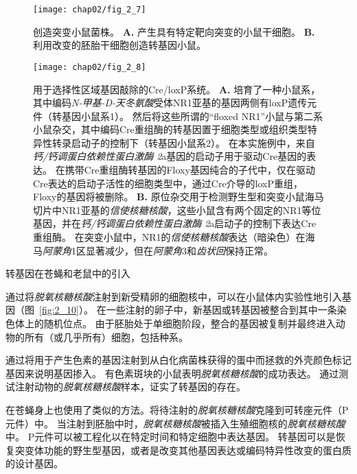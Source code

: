 \begin{figure}[htbp]
	\centering
	\texttt{[image: chap02/fig\_2\_7]}
	\caption{创造突变小鼠菌株\cite{alberts2017molecular}。
		\textbf{A.} 产生具有特定靶向突变的小鼠干细胞。
		\textbf{B.} 利用改变的胚胎干细胞创造转基因小鼠。}
	\label{fig:2_7}
\end{figure}


\begin{figure}[htbp]
	\centering
	\texttt{[image: chap02/fig\_2\_8]}
	\caption{用于选择性区域基因敲除的Cre/loxP系统。
		\textbf{A.} 培育了一种小鼠系，其中编码\textit{N-甲基-D-天冬氨酸}受体NR1亚基的基因两侧有loxP遗传元件（转基因小鼠系1）。
		然后将这些所谓的“floxed NR1”小鼠与第二系小鼠杂交，其中编码Cre重组酶的转基因置于细胞类型或组织类型特异性转录启动子的控制下（转基因小鼠系2）。
		在本实施例中，来自\textit{钙/钙调蛋白依赖性蛋白激酶 2}a基因的启动子用于驱动Cre基因的表达。
		在携带Cre重组酶转基因的Floxy基因纯合的子代中，仅在驱动Cre表达的启动子活性的细胞类型中，通过Cre介导的loxP重组，Floxy的基因将被删除。
		\textbf{B.} 原位杂交用于检测野生型和突变小鼠海马切片中NR1亚基的\textit{信使核糖核酸}，这些小鼠含有两个固定的NR1等位基因，并在\textit{钙/钙调蛋白依赖性蛋白激酶 2}a启动子的控制下表达Cre重组酶。
		在突变小鼠中，NR1的\textit{信使核糖核酸}表达（暗染色）在海马\textit{阿蒙角}1区显著减少，但在\textit{阿蒙角}3和\textit{齿状回}保持正常\cite{tsien1996essential}。}
	\label{fig:2_8}
\end{figure}



\begin{proposition}[神经解剖学导航术语] \label{box:2_3}
	
	\quad \quad 转基因在苍蝇和老鼠中的引入
	
	\quad \quad 通过将\textit{脱氧核糖核酸}注射到新受精卵的细胞核中，可以在小鼠体内实验性地引入基因（图~\ref{fig:2_10}）。
	在一些注射的卵子中，新基因或转基因被整合到其中一条染色体上的随机位点。
	由于胚胎处于单细胞阶段，整合的基因被复制并最终进入动物的所有（或几乎所有）细胞，包括种系。
	
	\quad \quad 通过将用于产生色素的基因注射到从白化病菌株获得的蛋中而拯救的外壳颜色标记基因来说明基因掺入。
	有色素斑块的小鼠表明\textit{脱氧核糖核酸}的成功表达。
	通过测试注射动物的\textit{脱氧核糖核酸}样本，证实了转基因的存在。
	
	\quad \quad 在苍蝇身上也使用了类似的方法。将待注射的\textit{脱氧核糖核酸}克隆到可转座元件（P元件）中。
	当注射到胚胎中时，\textit{脱氧核糖核酸}被插入生殖细胞核的\textit{脱氧核糖核酸}中。
	P元件可以被工程化以在特定时间和特定细胞中表达基因。
	转基因可以是恢复突变体功能的野生型基因，或者是改变其他基因表达或编码特异性改变的蛋白质的设计基因。
	
\end{proposition}


